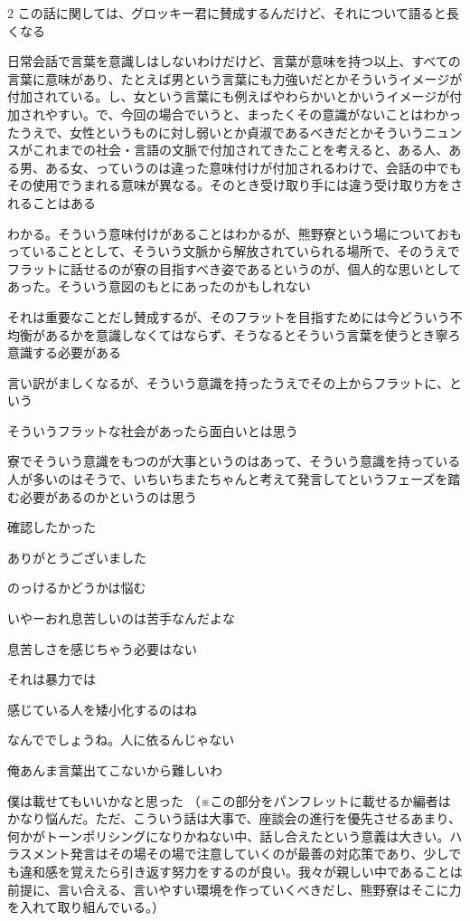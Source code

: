 \begin{multicols}{2}
 この話に関しては、グロッキー君に賛成するんだけど、それについて語ると長くなる

 日常会話で言葉を意識しはしないわけだけど、言葉が意味を持つ以上、すべての言葉に意味があり、たとえば男という言葉にも力強いだとかそういうイメージが付加されている。し、女という言葉にも例えばやわらかいとかいうイメージが付加されやすい。で、今回の場合でいうと、まったくその意識がないことはわかったうえで、女性というものに対し弱いとか貞淑であるべきだとかそういうニュンスがこれまでの社会・言語の文脈で付加されてきたことを考えると、ある人、ある男、ある女、っていうのは違った意味付けが付加されるわけで、会話の中でもその使用でうまれる意味が異なる。そのとき受け取り手には違う受け取り方をされることはある

 わかる。そういう意味付けがあることはわかるが、熊野寮という場についておもっていることとして、そういう文脈から解放されていられる場所で、そのうえでフラットに話せるのが寮の目指すべき姿であるというのが、個人的な思いとしてあった。そういう意図のもとにあったのかもしれない

 それは重要なことだし賛成するが、そのフラットを目指すためには今どういう不均衡があるかを意識しなくてはならず、そうなるとそういう言葉を使うとき寧ろ意識する必要がある

 言い訳がましくなるが、そういう意識を持ったうえでその上からフラットに、という

 そういうフラットな社会があったら面白いとは思う

 寮でそういう意識をもつのが大事というのはあって、そういう意識を持っている人が多いのはそうで、いちいちまたちゃんと考えて発言してというフェーズを踏む必要があるのかというのは思う

 確認したかった

 ありがとうございました

 のっけるかどうかは悩む

 いやーおれ息苦しいのは苦手なんだよな

 息苦しさを感じちゃう必要はない

 それは暴力では

 感じている人を矮小化するのはね

 なんででしょうね。人に依るんじゃない

 俺あんま言葉出てこないから難しいわ

 僕は載せてもいいかなと思った
（※この部分をパンフレットに載せるか編者はかなり悩んだ。ただ、こういう話は大事で、座談会の進行を優先させるあまり、何かがトーンポリシングになりかねない中、話し合えたという意義は大きい。ハラスメント発言はその場その場で注意していくのが最善の対応策であり、少しでも違和感を覚えたら引き返す努力をするのが良い。我々が親しい中であることは前提に、言い合える、言いやすい環境を作っていくべきだし、熊野寮はそこに力を入れて取り組んでいる。）


\end{multicols}
